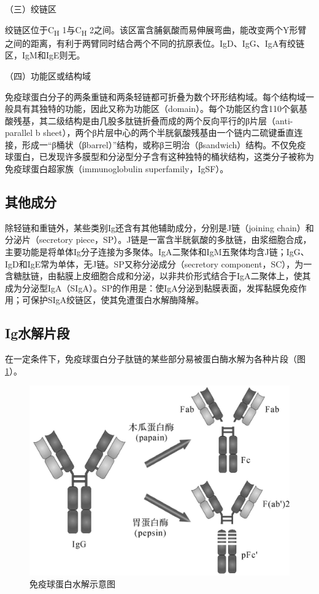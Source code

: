 （三）绞链区

绞链区位于C\textsubscript{H} 1与C\textsubscript{H}
2之间。该区富含脯氨酸而易伸展弯曲，能改变两个Y形臂之间的距离，有利于两臂同时结合两个不同的抗原表位。IgD、IgG、IgA有绞链区，IgM和IgE则无。

（四）功能区或结构域

免疫球蛋白分子的两条重链和两条轻链都可折叠为数个环形结构域。每个结构域一般具有其独特的功能，因此又称为功能区（domain）。每个功能区约含110个氨基酸残基，其二级结构是由几股多肽链折叠而成的两个反向平行的β片层（anti-parallel
b
sheet），两个β片层中心的两个半胱氨酸残基由一个链内二硫键垂直连接，形成一“β桶状（βbarrel）”结构，或称β三明治（βsandwich）结构。不仅免疫球蛋白，已发现许多膜型和分泌型分子含有这种独特的桶状结构，这类分子被称为免疫球蛋白超家族（immunoglobulin
superfamily，IgSF）。


\subsection{其他成分}

除轻链和重链外，某些类别Ig还含有其他辅助成分，分别是J链（joining
chain）和分泌片（secretory
piece，SP）。J链是一富含半胱氨酸的多肽链，由浆细胞合成，主要功能是将单体Ig分子连接为多聚体。IgA二聚体和IgM五聚体均含J链；IgG、IgD和IgE常为单体，无J链。SP又称分泌成分（secretory
component，SC），为一含糖肽链，由黏膜上皮细胞合成和分泌，以非共价形式结合于IgA二聚体上，使其成为分泌型IgA（SIgA）。SP的作用是：使IgA分泌到黏膜表面，发挥黏膜免疫作用；可保护SIgA绞链区，使其免遭蛋白水解酶降解。


\subsection{Ig水解片段}

在一定条件下，免疫球蛋白分子肽链的某些部分易被蛋白酶水解为各种片段（图\ref{fig4-4}）。

\begin{figure}[!htbp]
 \centering
 \includegraphics{./images/Image00064.jpg}
 \captionsetup{justification=centering}
 \caption{免疫球蛋白水解示意图}
 \label{fig4-4}
  \end{figure} 

